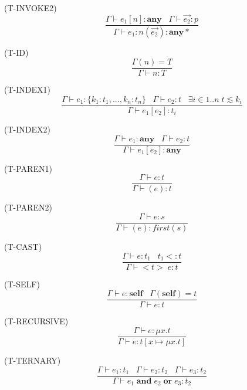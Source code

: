 \documentclass{paper}
\newcommand{\Any}{\mathbf{any}}
\newcommand{\Self}{\mathbf{self}}
\newcommand{\mylabel}[1]{\; (\textsc{#1})}
\newcommand{\env}{\Gamma}
\newcommand{\subtype}{<:}
\begin{document}
\mylabel{T-INVOKE2}
\[
\dfrac{\env \vdash e_{1}[n]:\Any \;\;\;
       \env \vdash \vec{e_{2}}:p}
      {\env \vdash e_{1}{:}n(\vec{e_{2}}):\Any{*}}
\]

\mylabel{T-ID}
\[
\dfrac{\env(n) = T}
      {\env \vdash n:T}
\]

\mylabel{T-INDEX1}
\[
\dfrac{\env \vdash e_{1}:\{k_{1}{:}t_{1}, ..., k_{n}{:}t_{n}\} \;\;\;
       \env \vdash e_{2}:t \;\;\;
       \exists i \in 1{..}n \; t \lesssim k_{i}}
      {\env \vdash e_{1}[e_{2}]:t_{i}}
\]

\mylabel{T-INDEX2}
\[
\dfrac{\env \vdash e_{1}:\Any \;\;\;
       \env \vdash e_{2}:t}
      {\env \vdash e_{1}[e_{2}]:\Any}
\]

\mylabel{T-PAREN1}
\[
\dfrac{\env \vdash e:t}
      {\env \vdash (e):t}
\]

\mylabel{T-PAREN2}
\[
\dfrac{\env \vdash e:s}
      {\env \vdash (e):first(s)}
\]

\mylabel{T-CAST}
\[
\dfrac{\env \vdash e:t_{1} \;\;\;
       t_{1} \subtype t}
      {\env \vdash {<}t{>} \; e:t}
\]

\mylabel{T-SELF}
\[
\dfrac{\env \vdash e:\Self \;\;\;
       \env(\Self) = t}
      {\env \vdash e:t}
\]

\mylabel{T-RECURSIVE}
\[
\dfrac{\env \vdash e:\mu x.t}
      {\env \vdash e:t[x \mapsto \mu x.t]}
\]

\mylabel{T-TERNARY}
\[
\dfrac{\env \vdash e_{1}:t_{1} \;\;\;
       \env \vdash e_{2}:t_{2} \;\;\;
       \env \vdash e_{3}:t_{2}}
      {\env \vdash e_{1} \; \mathbf{and} \; e_{2} \; \mathbf{or} \; e_{3}:t_{2}}
\]
\end{document}
